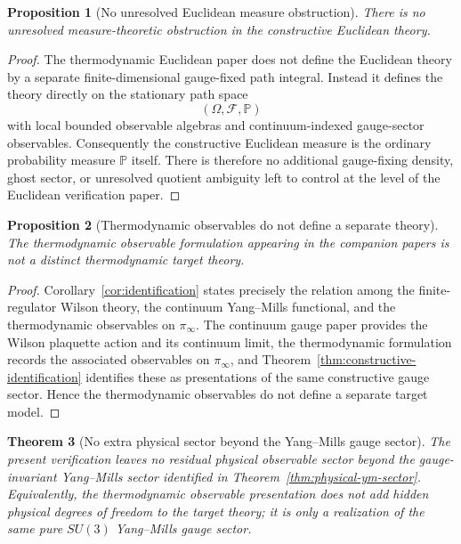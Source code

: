\documentclass[11pt]{article}
\newtheorem{theorem}{Theorem}[section]
\newtheorem{proposition}[theorem]{Proposition}
\theoremstyle{definition}
\theoremstyle{remark}
\begin{document}
\begin{proposition}[No unresolved Euclidean measure obstruction]
\label{prop:no-gauge-obstruction}
There is no unresolved measure-theoretic obstruction in the constructive
Euclidean theory.
\end{proposition}

\begin{proof}
The thermodynamic Euclidean paper does not define the Euclidean theory by a
separate finite-dimensional gauge-fixed path integral.  Instead it defines the
theory directly on the stationary path space
\[
(\Omega,\mathcal F,\mathbb P)
\]
with local bounded observable algebras and continuum-indexed gauge-sector
observables.  Consequently the constructive Euclidean measure is the ordinary
probability measure $\mathbb P$ itself.  There is therefore no additional
gauge-fixing density, ghost sector, or unresolved quotient ambiguity left to
control at the level of the Euclidean verification paper.
\end{proof}

\begin{proposition}[Thermodynamic observables do not define a separate theory]
\label{prop:not-different-theory}
The thermodynamic observable formulation appearing in the companion papers is
not a distinct thermodynamic target theory.
\end{proposition}

\begin{proof}
Corollary~\ref{cor:identification} states precisely the relation among the
finite-regulator Wilson theory, the continuum Yang--Mills functional, and the
thermodynamic observables on $\pi_\infty$.  The continuum gauge paper provides
the Wilson plaquette action and its continuum limit, the thermodynamic
formulation records the associated observables on $\pi_\infty$, and
Theorem~\ref{thm:constructive-identification} identifies these as presentations
of the same constructive gauge sector.  Hence the thermodynamic observables do
not define a separate target model.
\end{proof}

\begin{theorem}[No extra physical sector beyond the Yang--Mills gauge sector]
\label{thm:no-extra-physical-sector}
The present verification leaves no residual physical observable sector beyond
the gauge-invariant Yang--Mills sector identified in
Theorem~\ref{thm:physical-ym-sector}.  Equivalently, the thermodynamic
observable presentation does not add hidden physical degrees of freedom to the
target theory; it is only a realization of the same pure \(SU(3)\)
Yang--Mills gauge sector.
\end{theorem}
\end{document}
